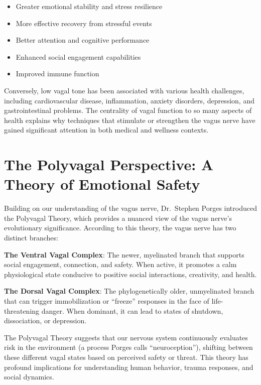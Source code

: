 \documentclass[
  Letterpaper,
]{scrbook}
\providecommand{\tightlist}{%
  \setlength{\itemsep}{0pt}\setlength{\parskip}{0pt}}\usepackage{longtable,booktabs,array}
\begin{document}
\begin{itemize}
\tightlist
\item
  Greater emotional stability and stress resilience
\item
  More effective recovery from stressful events
\item
  Better attention and cognitive performance
\item
  Enhanced social engagement capabilities
\item
  Improved immune function
\end{itemize}

Conversely, low vagal tone has been associated with various health
challenges, including cardiovascular disease, inflammation, anxiety
disorders, depression, and gastrointestinal problems. The centrality of
vagal function to so many aspects of health explains why techniques that
stimulate or strengthen the vagus nerve have gained significant
attention in both medical and wellness contexts.

\section{The Polyvagal Perspective: A Theory of Emotional
Safety}\label{the-polyvagal-perspective-a-theory-of-emotional-safety}

Building on our understanding of the vagus nerve, Dr.~Stephen Porges
introduced the Polyvagal Theory, which provides a nuanced view of the
vagus nerve's evolutionary significance. According to this theory, the
vagus nerve has two distinct branches:

\textbf{The Ventral Vagal Complex}: The newer, myelinated branch that
supports social engagement, connection, and safety. When active, it
promotes a calm physiological state conducive to positive social
interactions, creativity, and health.

\textbf{The Dorsal Vagal Complex}: The phylogenetically older,
unmyelinated branch that can trigger immobilization or ``freeze''
responses in the face of life-threatening danger. When dominant, it can
lead to states of shutdown, dissociation, or depression.

The Polyvagal Theory suggests that our nervous system continuously
evaluates risk in the environment (a process Porges calls
``neuroception''), shifting between these different vagal states based
on perceived safety or threat. This theory has profound implications for
understanding human behavior, trauma responses, and social dynamics.
\end{document}
